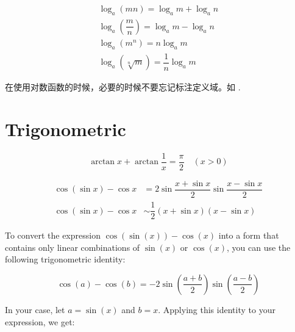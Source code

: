 \begin{theorem}
    \begin{gather*}
        \log_a (mn) = \log_a m + \log_a n \\
        \log_a \left(\dfrac{m}{n}\right) = \log_a m - \log_a n \\
        \log_a \left(m^n\right) = n \log_a m  \\
        \log_a \left(\sqrt[n]{m}\right) = \dfrac{1}{n} \log_a m
    \end{gather*}
\end{theorem}

在使用对数函数的时候，必要的时候不要忘记标注定义域。如
\cite[page 76, pdf 87, example 2]{we}.

\section{Trigonometric} \label{trigonometric}

\begin{corollary}
    \begin{equation}
        \arctan x + \arctan \dfrac{1}{x} = \dfrac{\pi}{2} \quad (x > 0)
    \end{equation}
\end{corollary}

\begin{corollary}
    \begin{align}
        \cos(\sin x) - \cos x &=    2 \sin \dfrac{x + \sin x}{2} \sin \dfrac{x- \sin x}{2} \label{eq:fucking-socalled-trig-formula} \\
        \cos(\sin x) - \cos x &\sim \dfrac{1}{2} ( x + \sin x )( x - \sin x ) 
    \end{align}
\end{corollary}

To convert the expression $\cos(\sin(x)) - \cos(x)$ 
into a form that contains only linear combinations of 
$\sin(x)$ or $\cos(x)$, 
you can use the following trigonometric identity:

\begin{theorem}
    \label{thm:a-magic-theorem-which-I-dont-know-its-name-about-trig}
    \begin{equation*}
        \cos(a) - \cos(b) = -2 \sin\left(\frac{a + b}{2}\right) \sin\left(\frac{a - b}{2}\right)
    \end{equation*}
\end{theorem}

In your case, let $a = \sin(x)$ and $b = x$. 
Applying this identity to your expression, we get:

